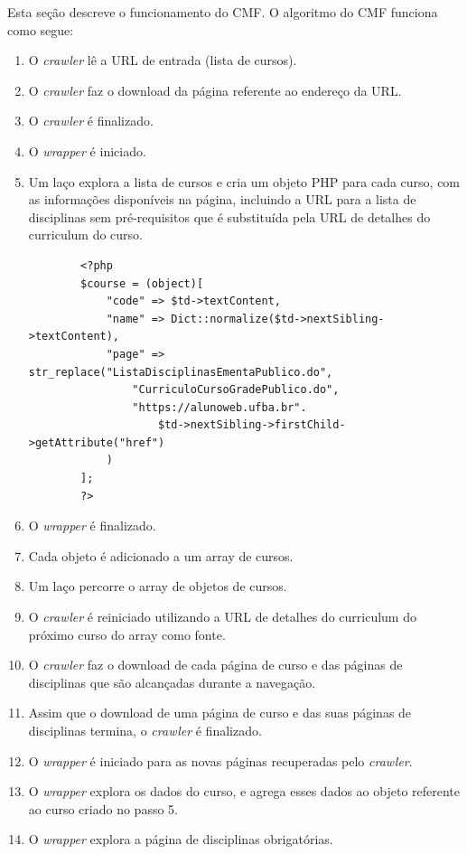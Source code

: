 Esta seção descreve o funcionamento do CMF. O algoritmo do CMF funciona como segue:

\begin{enumerate}
    \item O \textit{crawler} lê a URL de entrada (lista de cursos).
    \item O \textit{crawler} faz o download da página referente ao endereço da URL.
    \item O \textit{crawler} é finalizado.
    \item O \textit{wrapper} é iniciado.
    \item Um laço explora a lista de cursos e cria um objeto PHP para cada curso, com as informações disponíveis na página, incluindo a URL para a lista de disciplinas sem pré-requisitos que é substituída pela URL de detalhes do curriculum do curso.
    \begin{verbatim}
        <?php
        $course = (object)[
            "code" => $td->textContent,
            "name" => Dict::normalize($td->nextSibling->textContent),
            "page" => str_replace("ListaDisciplinasEmentaPublico.do",
                "CurriculoCursoGradePublico.do", 
                "https://alunoweb.ufba.br".
                    $td->nextSibling->firstChild->getAttribute("href")
            )
        ];
        ?>
        \end{verbatim}
    \item O \textit{wrapper} é finalizado.
    \item Cada objeto é adicionado a um array de cursos.
    \item Um laço percorre o array de objetos de cursos.
    \item O \textit{crawler} é reiniciado utilizando a URL de detalhes do curriculum do próximo curso do array como fonte.
    \item O \textit{crawler} faz o download de cada página de curso e das páginas de disciplinas que são alcançadas durante a navegação.
    \item Assim que o download de uma página de curso e das suas páginas de disciplinas termina, o \textit{crawler} é finalizado.
    \item O \textit{wrapper} é iniciado para as novas páginas recuperadas pelo \textit{crawler}.
    \item O \textit{wrapper} explora os dados do curso, e agrega esses dados ao objeto referente ao curso criado no passo 5.
    \item O \textit{wrapper} explora a página de disciplinas obrigatórias.

\end{enumerate}
